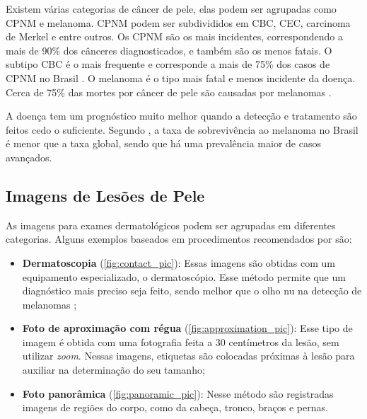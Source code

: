 Existem várias categorias de câncer de pele, elas podem ser agrupadas como \ac{CPNM} e melanoma. \ac{CPNM} podem ser subdivididos em \ac{CBC}, \ac{CEC}, carcinoma de
Merkel e entre outros. Os \ac{CPNM} são os mais incidentes, correspondendo a mais de 90\% dos cânceres diagnosticados, e também são os menos fatais. O subtipo \ac{CBC} é o
mais frequente e corresponde a mais de 75\% dos casos de \ac{CPNM} no Brasil \cite{skin_cancer_zink}. O melanoma é o tipo mais fatal e menos incidente da doença. Cerca
de 75\% das mortes por câncer de pele são causadas por melanomas \cite{skin_cancer_screening}.

A doença tem um prognóstico muito melhor quando a detecção e tratamento são feitos cedo o suficiente. Segundo \textcite{skin_cancer_survival}, a taxa de sobrevivência ao
melanoma no Brasil é menor que a taxa global, sendo que há uma prevalência maior de casos avançados.

\subsection{Imagens de Lesões de Pele}

As imagens para exames dermatológicos podem ser agrupadas em diferentes categorias. Alguns exemplos baseados em procedimentos recomendados por
\textcite{fotos_dermatologia} são:

\begin{itemize}
      \item \textbf{Dermatoscopia} (\autoref{fig:contact_pic}): Essas imagens são obtidas com um equipamento especializado, o dermatoscópio. Esse método permite que um
            diagnóstico mais preciso seja feito, sendo melhor que o olho nu na detecção de melanomas \cite{dermatoscopy};
      \item \textbf{Foto de aproximação com régua} (\autoref{fig:approximation_pic}): Esse tipo de imagem é obtida com uma fotografia feita a 30 centímetros da lesão,
            sem utilizar \textit{zoom}. Nessas imagens, etiquetas são colocadas próximas à lesão para auxiliar na determinação do seu tamanho;
      \item \textbf{Foto panorâmica} (\autoref{fig:panoramic_pic}): Nesse método são registradas imagens de regiões do corpo, como da cabeça, tronco, braços e pernas.
\end{itemize}

